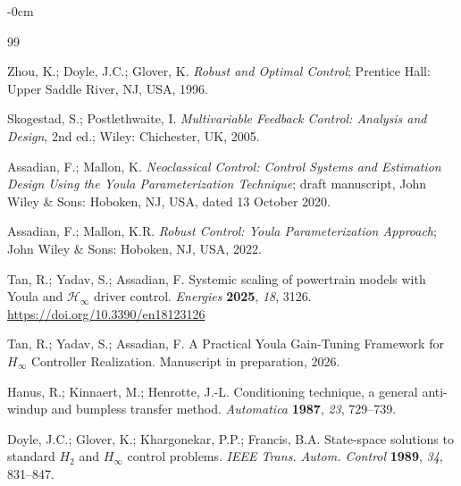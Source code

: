 \documentclass[energies,article,submit,pdftex,oneauthor]{Definitions/mdpi}
\begin{document}
\begin{adjustwidth}{-\extralength}{0cm}


\begin{thebibliography}{99}

Zhou, K.; Doyle, J.C.; Glover, K. \textit{Robust and Optimal Control}; Prentice Hall: Upper
Saddle River, NJ, USA, 1996.

Skogestad, S.; Postlethwaite, I. \textit{Multivariable Feedback Control: Analysis and Design},
2nd ed.; Wiley: Chichester, UK, 2005.

Assadian, F.; Mallon, K. \textit{Neoclassical Control: Control Systems and Estimation Design
Using the Youla Parameterization Technique}; draft manuscript, John Wiley \& Sons: Hoboken, NJ,
USA, dated 13 October 2020.

Assadian, F.; Mallon, K.R. \textit{Robust Control: Youla Parameterization Approach};
John Wiley \& Sons: Hoboken, NJ, USA, 2022.

Tan, R.; Yadav, S.; Assadian, F. Systemic scaling of powertrain models with Youla and
$\mathcal{H}_\infty$ driver control. \textit{Energies} \textbf{2025}, \textit{18}, 3126.
\url{https://doi.org/10.3390/en18123126}

Tan, R.; Yadav, S.; Assadian, F. A Practical Youla Gain-Tuning Framework for $H_\infty$
Controller Realization. Manuscript in preparation, 2026.

Hanus, R.; Kinnaert, M.; Henrotte, J.-L. Conditioning technique, a general anti-windup and
bumpless transfer method. \textit{Automatica} \textbf{1987}, \textit{23}, 729--739.

Doyle, J.C.; Glover, K.; Khargonekar, P.P.; Francis, B.A. State-space solutions to standard
$H_2$ and $H_\infty$ control problems. \textit{IEEE Trans. Autom. Control} \textbf{1989},
\textit{34}, 831--847.


\end{thebibliography}
\end{adjustwidth}
\end{document}
